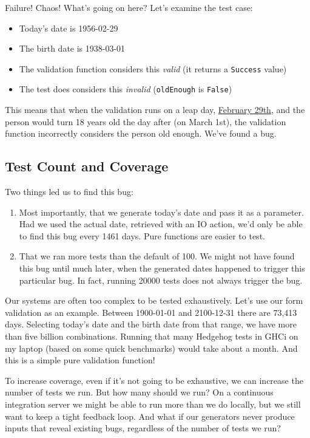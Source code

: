 \noindent Failure! Chaos! What's going on here? Let's examine the test case:

\begin{itemize}

\item
  Today's date is 1956-02-29
\item
  The birth date is 1938-03-01
\item
  The validation function considers this \emph{valid} (it returns a
  \texttt{Success} value)
\item
  The test does considers this \emph{invalid} (\texttt{oldEnough} is
  \texttt{False})
\end{itemize}

This means that when the validation runs on a leap day,
\href{https://en.wikipedia.org/wiki/February_29\#Born_on_February_29}{February
29th}, and the person would turn 18 years old the day after (on March
1st), the validation function incorrectly considers the person old
enough. We've found a bug.

\subsection{Test Count and Coverage}\label{test-count-and-coverage}

Two things led us to find this bug:

\begin{enumerate}
\item
  Most importantly, that we generate today's date and pass it as a
  parameter. Had we used the actual date, retrieved with an IO action,
  we'd only be able to find this bug every 1461 days. Pure functions are
  easier to test.
\item
  That we ran more tests than the default of 100. We might not have
  found this bug until much later, when the generated dates happened to
  trigger this particular bug. In fact, running 20000 tests does not
  always trigger the bug.
\end{enumerate}
Our systems are often too complex to be tested exhaustively. Let's use
our form validation as an example. Between 1900-01-01 and 2100-12-31
there are 73,413 days. Selecting today's date and the birth date from
that range, we have more than five billion combinations. Running that
many Hedgehog tests in GHCi on my laptop (based on some quick
benchmarks) would take about a month. And this is a simple pure
validation function!

To increase coverage, even if it's not going to be exhaustive, we can
increase the number of tests we run. But how many should we run? On a
continuous integration server we might be able to run more than we do
locally, but we still want to keep a tight feedback loop. And what if
our generators never produce inputs that reveal existing bugs,
regardless of the number of tests we run?

